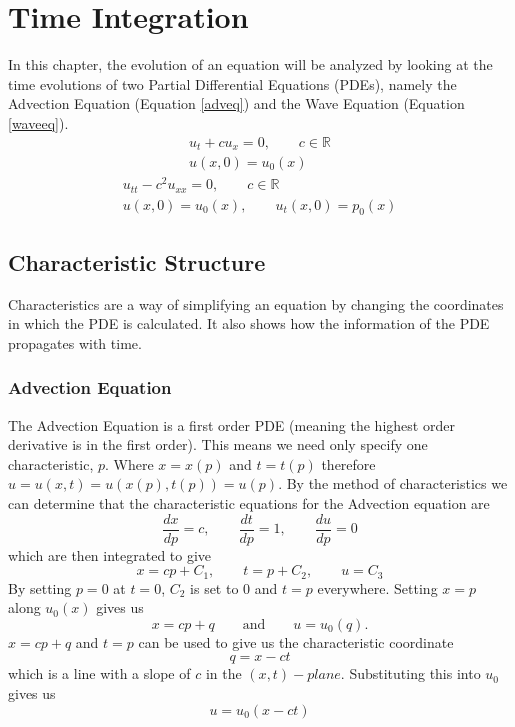 \chapter{Time Integration}
In this chapter, the evolution of an equation will be analyzed by looking at the time evolutions of two Partial Differential Equations (PDEs), namely the Advection Equation (Equation \ref{adveq}) and the Wave Equation (Equation \ref{waveeq}).
\begin{gather} \label{adveq}
  u_t + cu_x = 0, \qquad c \in \mathbb{R} \\ \nonumber
  u(x,0) = u_0(x)
\end{gather}
\begin{gather} \label{waveeq}
  u_{tt} - c^2u_{xx} = 0, \qquad c \in \mathbb{R} \\ \nonumber
  u(x,0) = u_0(x), \qquad u_t(x,0) = p_0(x)
\end{gather}
\section{Characteristic Structure}
Characteristics are a way of simplifying an equation by changing the coordinates in which the PDE is calculated. It also shows how the information of the PDE propagates with time.
\subsection{Advection Equation}
The Advection Equation is a first order PDE (meaning the highest order derivative is in the first order). This means we need only specify one characteristic, $p$. Where $x = x(p)$ and $t = t(p)$ therefore $u = u(x,t) = u(x(p),t(p)) = u(p)$.
\linebreak
\linebreak
By the method of characteristics we can determine that the characteristic equations for the Advection equation are
\begin{equation}
\frac{dx}{dp} = c, \qquad \frac{dt}{dp} = 1, \qquad \frac{du}{dp} = 0
\end{equation}
which are then integrated to give
\begin{equation}
  x = cp + C_1, \qquad t = p + C_2, \qquad u = C_3
\end{equation}
By setting $p=0$ at $t=0$, $C_2$ is set to 0 and $t=p$ everywhere. Setting $x=p$ along $u_0(x)$ gives us 
\begin{equation}
x=cp+q \qquad \text{and} \qquad u=u_0(q).
\end{equation}
\linebreak
\linebreak
$x=cp+q$ and $t=p$ can be used to give us the characteristic coordinate 
\begin{equation}
q=x-ct
\end{equation}
which is a line with a slope of $c$ in the $(x,t)-plane$. Substituting this into $u_0$ gives us
\begin{equation}
  u = u_0(x - ct)
\end{equation}
